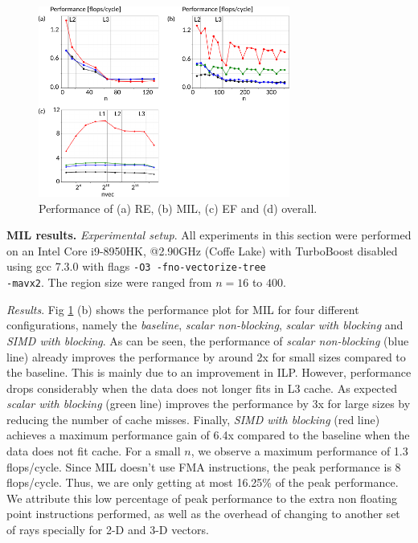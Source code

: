 \documentclass[letterpaper]{article}
\newcommand{\mypar}[1]{{\bf #1.}}
\begin{document}
\begin{figure}[t]
    \centering \includegraphics[width=3.25in]{figs/plots/overall/overall_performance.pdf}
    \caption{Performance of (a) RE, (b) MIL, (c) EF and (d) overall.}
    \label{fig:performance}
\end{figure}

\mypar{MIL results} 
\textit{Experimental setup}.
All experiments in this section were performed on an Intel Core i9-8950HK, @2.90GHz (Coffe Lake) with TurboBoost disabled using gcc 7.3.0 with flags \texttt{-O3 -fno-vectorize-tree \\-mavx2}. The region size were ranged from $n=16$ to $400$.

\textit{Results}. Fig \ref{fig:performance} (b) shows the performance plot for MIL for four different configurations, namely the \textit{baseline},\textit{ scalar non-blocking}, \textit{scalar with blocking} and \textit{SIMD with blocking}. As can be seen, the performance of \textit{scalar non-blocking} (blue line) already improves the performance by around 2x for small sizes compared to the baseline. This is mainly due to an improvement in ILP. However, performance drops considerably when the data does not longer fits in L3 cache. As expected \textit{scalar with blocking} (green line) improves the performance by 3x for large sizes by reducing the number of cache misses. Finally, \textit{SIMD with blocking} (red line) achieves a maximum performance gain of 6.4x compared to the baseline when the data does not fit cache. For a small $n$, we observe a maximum performance of 1.3 flops/cycle. Since MIL doesn't use FMA instructions, the peak performance is 8 flops/cycle. Thus, we are only getting at most 16.25\% of the peak performance. We attribute this low percentage of peak performance to the extra non floating point instructions performed, as well as the overhead of changing to another set of rays specially for 2-D and 3-D vectors.
\end{document}
